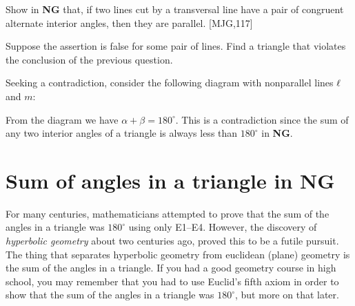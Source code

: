 \documentclass[handout]{ximera}
\begin{document}
\begin{question}
Show in \textbf{NG} that, if two lines cut by a transversal line have
a pair of congruent alternate interior angles, then they are
parallel. [MJG,117]
\begin{solution}
\begin{hint}
Suppose the assertion is false for some pair of lines. Find a triangle
that violates the conclusion of the previous question.
\end{hint}
\begin{freeResponse}
Seeking a contradiction, consider the following diagram with
nonparallel lines $\ell$ and $m$:
\begin{image}
\end{image}
From the diagram we have $\alpha + \beta = 180^\circ$. This is a
contradiction since the sum of any two interior angles of a triangle
is always less than $180^\circ$ in \textbf{NG}.
\end{freeResponse}
\end{solution}
\end{question}







\section*{Sum of angles in a triangle in NG}


For many centuries, mathematicians attempted to prove that the sum of
the angles in a triangle was $180^{\circ}$ using only E1--E4. However,
the discovery of \textit{hyperbolic geometry} about two centuries ago,
proved this to be a futile pursuit. The thing that separates
hyperbolic geometry from euclidean (plane) geometry is the sum of the
angles in a triangle. If you had a good geometry course in high
school, you may remember that you had to use Euclid's fifth axiom in
order to show that the sum of the angles in a triangle was
$180^{\circ}$, but more on that later.
\end{document}
